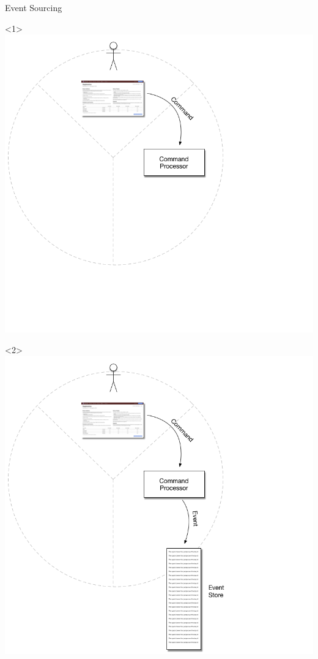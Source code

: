 \begin{frame}[fragile]{Event Sourcing}

\begin{onlyenv}<1>
\includegraphics[width=.7\textwidth]{../EventSourcing1.png}
\end{onlyenv}

\begin{onlyenv}<2>
\includegraphics[width=.7\textwidth]{../EventSourcing2.png}
\end{onlyenv}


\end{frame}
